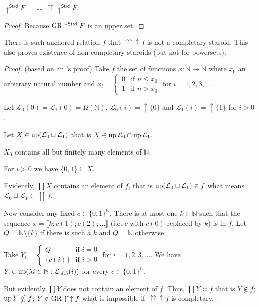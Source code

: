 \begin{prop}
$\uparrow^{\mathsf{Strd}}F=\downdownarrows\upuparrows\uparrow^{\mathsf{Strd}}F$.\end{prop}
\begin{proof}
Because $\operatorname{GR}\uparrow^{\mathsf{Strd}}F$ is an upper set.\end{proof}
\begin{example}
\label{non-completary}There is such anchored relation $f$ that $\upuparrows\uparrow f$
is not a completary staroid. This also proves existence of non completary
staroids (but not for powersets).\end{example}
\begin{proof}
(based on an 's proof) Take $f$ the set of functions
$x:\mathbb{N}\rightarrow\mathbb{N}$ where $x_{0}$ an arbitrary natural
number and $x_{i}=\left\{ \begin{array}{ll}
0 & \text{if }n\leqslant x_{0}\\
1 & \text{if }n>x_{0}
\end{array}\right.$ for $i=1,2,3,\ldots$.

Let $\mathcal{L}_{0}(0)=\mathcal{L}_{1}(0)=\Omega(\mathbb{N})$, $\mathcal{L}_{0}(i)=\uparrow\{0\}$
and $\mathcal{L}_{1}(i)=\uparrow\{1\}$ for $i>0$.

Let $X\in\operatorname{up}(\mathcal{L}_{0}\sqcup\mathcal{L}_{1})$ that is $X\in\operatorname{up}\mathcal{L}_{0}\cap\operatorname{up}\mathcal{L}_{1}$.

$X_{0}$ contains all but finitely many elements of $\mathbb{N}$.

For $i>0$ we have $\{0,1\}\subseteq X$.

Evidently, $\prod X$ contains an element of $f$,
that is $\operatorname{up}(\mathcal{L}_0\sqcup\mathcal{L}_1)\in f$ what means
$\mathcal{L}_0\sqcup\mathcal{L}_1\in\upuparrows f$.

Now consider any fixed $c\in\{0,1\}^{\mathbb{N}}$. There is at most
one $k\in\mathbb{N}$ such that the sequence $x=\llbracket k;c(1);c(2);\ldots\rrbracket$
(i.e. $c$ with $c(0)$ replaced by $k$) is in $f$. Let $Q=\mathbb{N}\setminus\{k\}$
if there is such a $k$ and $Q=\mathbb{N}$ otherwise.

Take $Y_{i}=\left\{ \begin{array}{ll}
Q & \text{if }i=0\\
\{c(i)\} & \text{if }i>0
\end{array}\right.$ for $i=1,2,3,\ldots$. We have $Y\in\operatorname{up}(\lambda i\in\mathbb{N}:\mathcal{L}_{c(i)}(i))$ for every $c\in\{0,1\}^n$.

But evidently $\prod Y$ does not contain an element of $f$.
Thus, $\prod Y\asymp f$ that is
$Y\notin f$; $\operatorname{up} Y\nsubseteq f$; $Y\notin\operatorname{GR}\upuparrows\uparrow f$ what is impossible if $\upuparrows\uparrow f$ is completary.
\end{proof}
